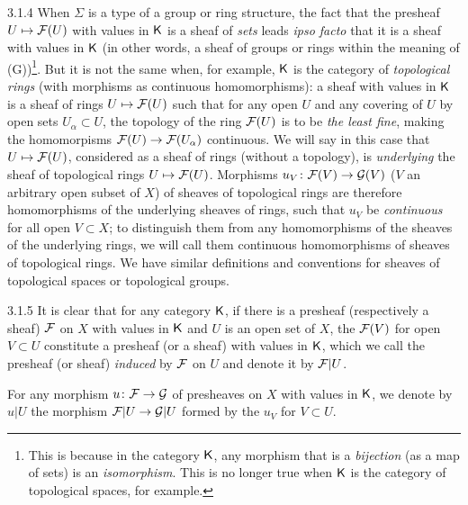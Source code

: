 \documentclass[../main.tex]{subfiles}
\begin{document}
\begin{env}{3.1.4}
When $\Sigma$ is a type of a group or ring structure, the fact that
the presheaf $U\mapsto\mathcal{F}(U)$ with values in $\mathsf{K}$ is a sheaf of \emph{sets} leads \emph{ipso facto}
that it is a sheaf with values in $\mathsf{K}$ (in other words, a sheaf of groups or rings
within the meaning of (G))\footnote{This is because in the category $\mathsf{K}$, any morphism that is a
\emph{bijection} (as a map of sets) is an \emph{isomorphism}. This is no longer true when $\mathsf{K}$
is the category of topological spaces, for example.}. But it is not the same when, for example,
$\mathsf{K}$ is the category of \emph{topological rings} (with morphisms as continuous homomorphisms): a sheaf
with values in $\mathsf{K}$ is a sheaf of rings $U\mapsto\mathcal{F}(U)$ such that for any open $U$
and any covering of $U$ by open sets $U_\alpha\subset U$, the topology of the ring $\mathcal{F}(U)$
is to be \emph{the least fine}, making the homomorpisms $\mathcal{F}(U)\to\mathcal{F}(U_\alpha)$ continuous. We will say in
this case that $U\mapsto\mathcal{F}(U)$, considered as a sheaf of rings (without a topology), is
\emph{underlying} the sheaf of topological rings $U\mapsto\mathcal{F}(U)$. Morphisms $u_V\colon\mathcal{F}(V)\to\mathcal{G}(V)$
($V$ an arbitrary open subset of $X$) of sheaves of topological rings are therefore homomorphisms of the
underlying sheaves of rings, such that $u_V$ be \emph{continuous} for all
open $V\subset X$; to distinguish them from any homomorphisms of the sheaves
of the underlying rings, we will call them continuous homomorphisms of sheaves of topological rings.
We have similar definitions and conventions for sheaves of topological spaces or topological groups.
\end{env}

\begin{env}{3.1.5}
It is clear that for any category $\mathsf{K}$, if there is a presheaf (respectively a
sheaf) $\mathcal{F}$ on $X$ with values in $\mathsf{K}$ and $U$ is an open set of $X$, the $\mathcal{F}(V)$ for
open $V\subset U$ constitute a presheaf (or a sheaf) with values in $\mathsf{K}$, which we call
the presheaf (or sheaf) \emph{induced} by $\mathcal{F}$ on $U$ and denote it by $\mathcal{F}|U$.

For any morphism $u\colon\mathcal{F}\to\mathcal{G}$ of presheaves on $X$ with values in $\mathsf{K}$, we
denote by $u|U$ the morphism $\mathcal{F}|U\to\mathcal{G}|U$ formed by the $u_V$ for $V\subset U$.
\end{env}
\end{document}
